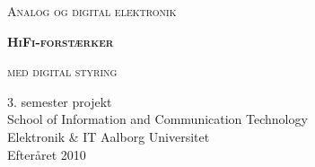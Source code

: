 \begin{center}
\textsc{\huge Analog og digital elektronik\\}
\vspace{20 mm}

\textsc{\textbf{\HUGE HiFi-forstærker}}
\vspace{5 mm}

\textsc{\Large med digital styring\\}
\vspace{75 mm}

\begin{flushright}
3. semester projekt \\
School of Information and Communication Technology \\
Elektronik \& IT Aalborg Universitet \\
Efteråret 2010 \\
\end{flushright}


\end{center}